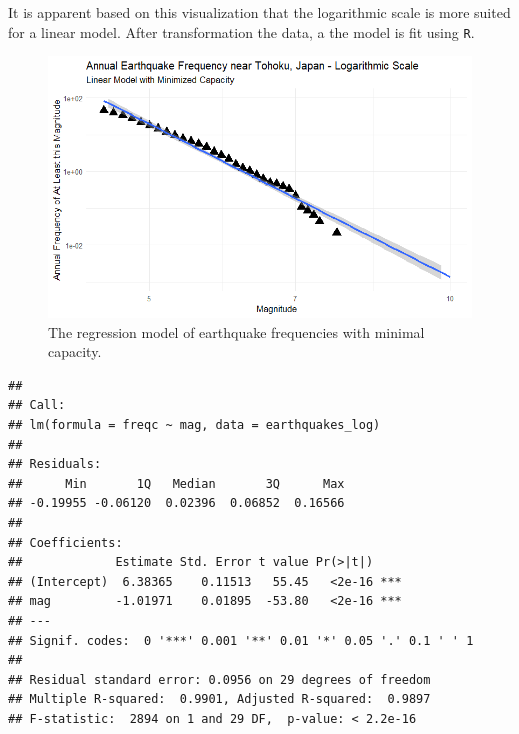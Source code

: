 It is apparent based on this visualization that the logarithmic scale is more suited for a linear model.  After transformation the data, a the model is fit using
\texttt{R}.

\begin{figure}[H]
    \center
    \includegraphics[width=0.5\linewidth]{Figures/tohoku_logscale_fit.png}
    \caption{\footnotesize{The regression model of earthquake frequencies with minimal capacity.}}
    \label{tohoku_lm}
\end{figure}

\begin{Shaded}
\begin{Highlighting}[]
\OtherTok{\textless{}{-}}\SpecialCharTok{\%\textgreater{}\%} \NormalTok{(} 

\OtherTok{\textless{}{-}} \NormalTok{(}\SpecialCharTok{\textasciitilde{}}

\end{Highlighting}
\end{Shaded}

\begin{verbatim}
## 
## Call:
## lm(formula = freqc ~ mag, data = earthquakes_log)
## 
## Residuals:
##      Min       1Q   Median       3Q      Max 
## -0.19955 -0.06120  0.02396  0.06852  0.16566 
## 
## Coefficients:
##             Estimate Std. Error t value Pr(>|t|)    
## (Intercept)  6.38365    0.11513   55.45   <2e-16 ***
## mag         -1.01971    0.01895  -53.80   <2e-16 ***
## ---
## Signif. codes:  0 '***' 0.001 '**' 0.01 '*' 0.05 '.' 0.1 ' ' 1
## 
## Residual standard error: 0.0956 on 29 degrees of freedom
## Multiple R-squared:  0.9901, Adjusted R-squared:  0.9897 
## F-statistic:  2894 on 1 and 29 DF,  p-value: < 2.2e-16
\end{verbatim}


